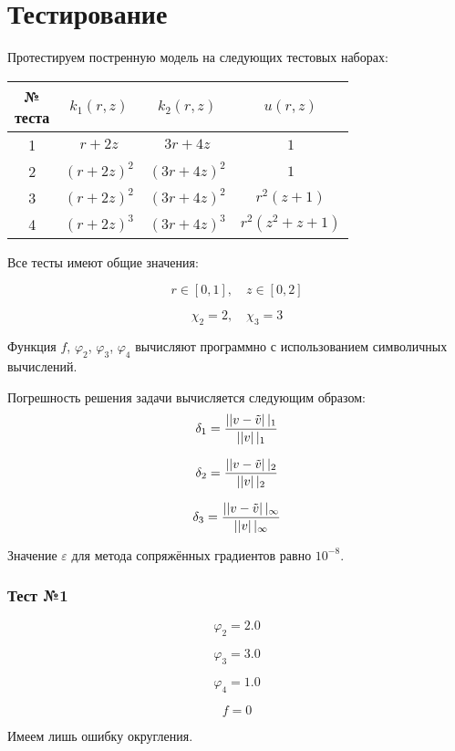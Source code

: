 \section{Тестирование}

Протестируем постренную модель на следующих тестовых наборах:

\begin{center}
  \begin{tabular}{*4{c}}
  \toprule
  \makecell{№ \\ теста} & $k_1(r, z)$ & $k_2(r, z)$ & $ u(r, z)$ \\
  \midrule
  1 & $ r + 2z $ & $ 3r + 4z $ & $1$ \\
  2 & $ (r + 2z)^2 $ & $ (3r + 4z)^2 $ & $1$ \\
  3 & $ (r + 2z)^2 $ & $ (3r + 4z)^2 $ & $r^2(z + 1)$ \\
  4 & $ (r + 2z)^3 $ & $ (3r + 4z)^3 $ & $r^2(z^2 + z + 1)$ \\
  \bottomrule
  \end{tabular}
\end{center}

Все тесты имеют общие значения:

\[
  r \in [0, 1],\quad z \in [0, 2]
\]

\[
  \chi_2 = 2,\quad \chi_3 = 3
\]

Функция $f$, $ \varphi_2 $, $ \varphi_3 $, $\varphi_4$ вычисляют программно
с использованием символичных вычислений.

Погрешность решения задачи вычисляется следующим образом:
\[
\delta_1 = \frac{\left|| v - \Tilde{v} \right||_1 }{\left|| v \right||_1 }
\]

\[
\delta_2 = \frac{\left|| v - \Tilde{v} \right||_2 }{\left|| v \right||_2 }
\]

\[
\delta_3 = \frac{\left|| v - \Tilde{v} \right||_\infty }{\left|| v \right||_\infty }
\]

Значение $ \varepsilon $ для метода сопряжённых градиентов равно $ 10^{-8} $.

\subsubsection*{Тест №1}

\[
 \varphi_2 = 2.0
\]

\[
 \varphi_3 = 3.0
\]

\[
 \varphi_4 = 1.0
\]

\[
  f = 0
\]

Имеем лишь ошибку округления.

